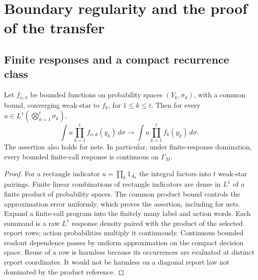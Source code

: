 \section{Boundary regularity and the proof of the transfer}\label{sec:proof}
\subsection{Finite responses and a compact recurrence class}
\begin{lemma}\label{lem:tensor}
Let $f_{n,k}$ be bounded functions on probability spaces $(Y_k,\sigma_k)$, with a common bound, converging weak-star to $f_k$, for $1\le k\le t$. Then for every $u\in L^1(\bigotimes_{k=1}^t\sigma_k)$,
\[
 \int u\prod_{k=1}^t f_{n,k}(y_k)\,d\sigma
 \longrightarrow \int u\prod_{k=1}^t f_k(y_k)\,d\sigma.
\]
The assertion also holds for nets. In particular, under finite-response domination, every bounded finite-call response is continuous on $\Gamma_M$.
\end{lemma}
\begin{proof}
For a rectangle indicator $u=\prod_k1_{A_k}$ the integral factors into $t$ weak-star pairings. Finite linear combinations of rectangle indicators are dense in $L^1$ of a finite product of probability spaces. The common product bound controls the approximation error uniformly, which proves the assertion, including for nets. Expand a finite-call program into the finitely many label and action words. Each summand is a raw $L^1$ response density paired with the product of the selected report rows; action probabilities multiply it continuously. Continuous bounded readout dependence passes by uniform approximation on the compact decision space. Reuse of a row is harmless because its occurrences are evaluated at distinct report coordinates. It would not be harmless on a diagonal report law not dominated by the product reference.
\end{proof}

